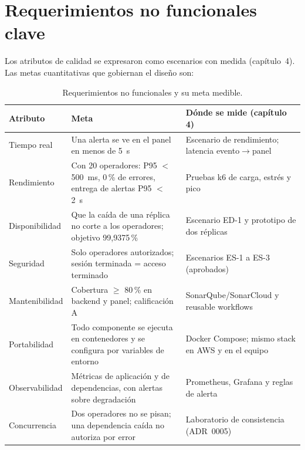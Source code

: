 \section{Requerimientos no funcionales clave}
Los atributos de calidad se expresaron como escenarios con medida (capítulo~4). Las metas cuantitativas que gobiernan el diseño son:

\begin{table}[H]
\centering\small
\caption{Requerimientos no funcionales y su meta medible.}\label{tab:rnf}
\begin{tabularx}{\textwidth}{lYY}
\toprule
\textbf{Atributo} & \textbf{Meta} & \textbf{Dónde se mide (capítulo 4)} \\
\midrule
Tiempo real & Una alerta se ve en el panel en menos de 5~s & Escenario de rendimiento; latencia evento$\rightarrow$panel \\
Rendimiento & Con 20 operadores: P95 $<$ 500~ms, 0\,\% de errores, entrega de alertas P95 $<$ 2~s & Pruebas k6 de carga, estrés y pico \\
Disponibilidad & Que la caída de una réplica no corte a los operadores; objetivo 99,9375\,\% & Escenario ED-1 y prototipo de dos réplicas \\
Seguridad & Solo operadores autorizados; sesión terminada = acceso terminado & Escenarios ES-1 a ES-3 (aprobados) \\
Mantenibilidad & Cobertura $\geq$ 80\,\% en backend y panel; calificación A & SonarQube/SonarCloud y reusable workflows \\
Portabilidad & Todo componente se ejecuta en contenedores y se configura por variables de entorno & Docker Compose; mismo stack en AWS y en el equipo \\
Observabilidad & Métricas de aplicación y de dependencias, con alertas sobre degradación & Prometheus, Grafana y reglas de alerta \\
Concurrencia & Dos operadores no se pisan; una dependencia caída no autoriza por error & Laboratorio de consistencia (ADR~0005) \\
\bottomrule
\end{tabularx}
\end{table}
